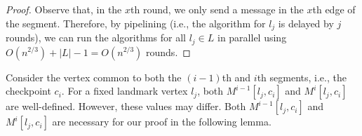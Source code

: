 \begin{proof}
Observe that, in the $x$th round, we only send a message in the $x$th edge of the segment. 
Therefore, by pipelining (i.e., the algorithm for $l_j$ is delayed by $j$ rounds), we can run the algorithms for all $l_j \in L$ in parallel using $O(n^{2/3}) + |L|-1 = O(n^{2/3})$ rounds.
\end{proof}


Consider the vertex common to both the $(i-1)$th and $i$th segments, i.e., the checkpoint $c_i$. For a fixed landmark vertex $l_j$, both $M^{i-1}[l_j, c_i]$ and $M^{i}[l_j, c_i]$ are well-defined. However, these values may differ. Both $M^{i-1}[l_j, c_i]$ and $M^{i}[l_j, c_i]$ are necessary for our proof in the following lemma. %


